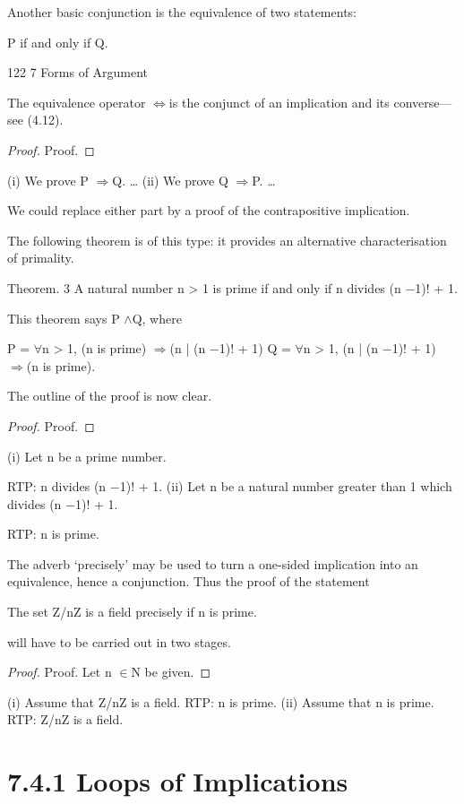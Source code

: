 \documentclass[11pt]{article}
\theoremstyle{plain}
\theoremstyle{definition}
\begin{document}
Another basic conjunction is the equivalence of two statements:

P if and only if Q.

122 7 Forms of Argument

The equivalence operator $\Leftrightarrow$is the conjunct of an implication and its converse---see (4.12).

\begin{proof}
Proof.
\end{proof}

(i) We prove P $\Rightarrow$Q. \dots{} (ii) We prove Q $\Rightarrow$P. \dots{}

We could replace either part by a proof of the contrapositive implication.

The following theorem is of this type: it provides an alternative characterisation of primality.

Theorem. 3 A natural number n > 1 is prime if and only if n divides (n $-$1)! + 1.

This theorem says P $\land$Q, where

P = $\forall$n > 1, (n is prime) $\Rightarrow$(n | (n $-$1)! + 1) Q = $\forall$n > 1, (n | (n $-$1)! + 1) $\Rightarrow$(n is prime).

The outline of the proof is now clear.

\begin{proof}
Proof.
\end{proof}

(i) Let n be a prime number.

RTP: n divides (n $-$1)! + 1. (ii) Let n be a natural number greater than 1 which divides (n $-$1)! + 1.

RTP: n is prime.

The adverb `precisely' may be used to turn a one-sided implication into an equivalence, hence a conjunction. Thus the proof of the statement

The set Z/nZ is a field precisely if n is prime.

will have to be carried out in two stages.

\begin{proof}
Proof. Let n $\in$N be given.
\end{proof}

(i) Assume that Z/nZ is a field. RTP: n is prime. (ii) Assume that n is prime. RTP: Z/nZ is a field.

\section{7.4.1 Loops of Implications}
\end{document}
